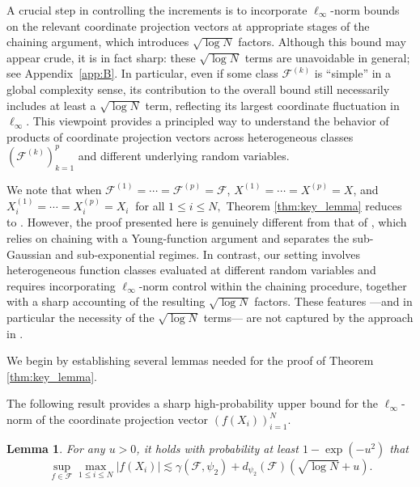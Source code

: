 \documentclass[numbers,webpdf,imaiai]{ima-authoring-template}
\theoremstyle{thmstyletwo}%
\newtheorem{remark}{Remark}%
\newtheorem{lemma}[theorem]{Lemma}
\numberwithin{equation}{section}
\numberwithin{equation}{section}
\newcommand{\F}{\mathcal{F}}
\begin{document}
A crucial step in controlling the increments is to incorporate $\ell_{\infty}$-norm bounds on the relevant coordinate projection vectors at appropriate stages of the chaining argument, which introduces $\sqrt{\log N}$ factors. Although this bound may appear crude, it is in fact sharp: these $\sqrt{\log N}$ terms are unavoidable in general; see Appendix~\ref{app:B}. In particular, even if some class $\F^{(k)}$ is ``simple'' in a global complexity sense, its contribution to the overall bound still necessarily includes at least a $\sqrt{\log N}$ term, reflecting its largest coordinate fluctuation in $\ell_{\infty}$. This viewpoint provides a principled way to understand the behavior of products of coordinate projection vectors across heterogeneous classes $(\F^{(k)})_{k=1}^{p}$ and different underlying random variables. 

We note that when $ \F^{(1)}= \cdots=\F^{(p)}=\F$, $X^{(1)}=\cdots =X^{(p)}=X$, and $X^{(1)}_i=\cdots = X^{(p)}_i=X_i \ $ for all $1\le i\le N,$ Theorem \ref{thm:key_lemma} reduces to \cite[Theorem 4.5]{al2025sharp}. However, the proof presented here is genuinely different from that of \cite[Theorem 4.5]{al2025sharp}, which relies on chaining with a Young-function argument and separates the sub-Gaussian and sub-exponential regimes. In contrast, our setting involves heterogeneous function classes evaluated at different random variables and requires incorporating $\ell_{\infty}$-norm control within the chaining procedure, together with a sharp accounting of the resulting $\sqrt{\log N}$ factors. These features ---and in particular the necessity of the $\sqrt{\log N}$ terms--- are not captured by the approach in \cite{al2025sharp}.



We begin by establishing several lemmas needed for the proof of Theorem \ref{thm:key_lemma}.

The following result provides a sharp high-probability upper bound for the $\ell_{\infty}$-norm of the coordinate projection vector $(f(X_i))_{i=1}^{N}$.

\begin{lemma}\label{lemma:infinity_norm_bound}
  For any $u>0$, it holds with probability at least $1-\exp(-u^2)$ that
  \[
\sup_{f\in \F} \max_{1\le i\le N} |f(X_i)|\lesssim \gamma(\F,\psi_2)+d_{\psi_2}(\F) (\sqrt{\log N}+u).
  \]
\end{lemma}

\end{document}
